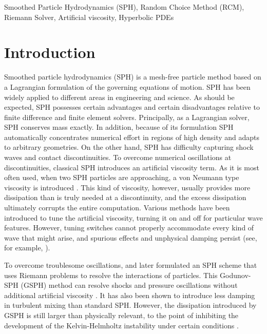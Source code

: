 \documentclass[review]{elsarticle}
\begin{document}
\begin{frontmatter}
\begin{abstract}
\end{abstract}
\begin{keyword}
Smoothed Particle Hydrodynamics (SPH), Random Choice Method (RCM), Riemann Solver, Artificial viscosity, Hyperbolic PDEs
\end{keyword}
\end{frontmatter}

\linenumbers
\section{Introduction}
Smoothed particle hydrodynamics (SPH) \citep{gingold1977smoothed,lucy1977numerical} is a mesh-free particle method based on a Lagrangian formulation of the governing equations of motion.
SPH has been widely applied to different areas in engineering and science. As should be expected, SPH possesses certain advantages and certain disadvantages relative to finite difference and finite element solvers. Principally, as a Lagrangian solver, SPH conserves mass exactly. 
In addition, because of its formulation SPH automatically concentrates numerical effort in regions of high density and adapts to arbitrary geometries. On the other hand, 
SPH has difficulty capturing shock waves and contact discontinuities. To overcome numerical oscillations at discontinuities, classical SPH introduces an artificial viscosity term. As it is most often used, when two SPH particles are approaching, a von Neumann type viscosity is introduced
\citep{monaghan1983shock, monaghan1997sph,klapp2012strong}. 
This kind of viscosity, however, usually provides more dissipation than is truly needed at a discontinuity, and the excess dissipation ultimately corrupts the entire computation. Various methods have been introduced to tune the artificial viscosity, turning it on and off for particular wave features. However, tuning switches cannot properly accommodate every kind of wave that might arise, and spurious effects and unphysical damping persist (see, for example, \cite{borgani2012hydrodynamic,flebbe1994smoothed,morris1997switch, dolag2005turbulent,cullen2010inviscid,sigalotti2008adaptive,puri2014comparison}).
 
To overcome troublesome oscillations, \citet{inutsuka2002reformulation} and later \citet{cha2003implementations} formulated an SPH scheme that uses Riemann problems to resolve the interactions of particles. This Godunov-SPH (GSPH) method can resolve shocks and pressure oscillations without additional artificial viscosity \citep{inutsuka2002reformulation, cha2003implementations,iwasaki2011smoothed, puri2014approximate,borgani2012hydrodynamic}. It has also been shown to introduce less damping in turbulent mixing \citep{cha2010kelvin, borgani2012hydrodynamic} than standard SPH. 
However, the dissipation introduced by GSPH is still larger than physically relevant, to the point
of inhibiting the development of the Kelvin-Helmholtz instability under certain conditions \citep{borgani2012hydrodynamic}.
\end{document}

